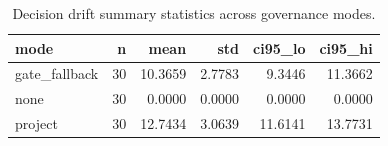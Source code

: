 \begin{table}
\caption{Decision drift summary statistics across governance modes.}
\label{tab:drift_summary}
\begin{tabular}{lrrrrr}
\toprule
mode & n & mean & std & ci95_lo & ci95_hi \\
\midrule
gate_fallback & 30 & 10.3659 & 2.7783 & 9.3446 & 11.3662 \\
none & 30 & 0.0000 & 0.0000 & 0.0000 & 0.0000 \\
project & 30 & 12.7434 & 3.0639 & 11.6141 & 13.7731 \\
\bottomrule
\end{tabular}
\end{table}
